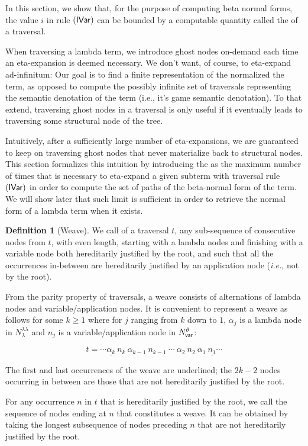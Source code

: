 \documentclass{article}
\makeatletter
\theoremstyle{definition}
\newtheorem{definition}{Definition}[section]
\newcommand\NodesVar{N_{\sf var}}%
\newcommand\NodesLmd{N_\lambda}%
\newcommand{\ghostlmd}{{\lambda\!\!\lambda}}
\newcommand{\ghostvar}{\theta}
\renewcommand\ie{{\it i.e.\@\xspace}}
\makeatother
\begin{document}
In this section, we show that, for the purpose of computing beta normal forms, the value $i$ in rule $\mathbf{({\sf IVar})}$ can be bounded by a computable quantity called the  of a traversal.

When traversing a lambda term, we introduce ghost nodes on-demand each time an eta-expansion is deemed necessary.
We don't want, of course, to eta-expand ad-infinitum: Our goal is to find a finite representation of the normalized the term, as opposed to compute the possibly infinite set of traversals representing the semantic denotation of the term (i.e., it's game semantic denotation). To that extend, traversing ghost nodes in a traversal is only useful if it eventually leads to traversing some structural node of the tree.

Intuitively, after a sufficiently large number of eta-expansions, we are guaranteed to keep on traversing ghost nodes that never materialize back to structural nodes. This section formalizes this intuition by introducing the  as the maximum number of times that is necessary to eta-expand a given subterm with traversal rule $\mathbf{({\sf IVar})}$ in order to compute the set of paths of the beta-normal form of the term. We will show later that such limit is sufficient in order to retrieve the normal form of a lambda term when it exists.

\begin{definition}[Weave]
We call  of a traversal $t$, any sub-sequence of consecutive nodes from $t$,
with even length, starting with a lambda nodes and finishing with a variable node both hereditarily justified by the root, and such that all the occurrences in-between are hereditarily justified by an application node (\ie, not by the root).

From the parity property of traversals, a weave consists of alternations of lambda nodes and variable/application nodes. It is convenient to represent a weave as follows for some $k\geq 1$ where for $j$ ranging from $k$ down to $1$, $\alpha_j$ is a lambda node in $\NodesLmd^\ghostlmd$ and $n_j$ is a variable/application node in $\NodesVar^\ghostvar$:

$$ t = \cdots \underline{\alpha_k}\ n_k\ \alpha_{k-1}\ n_{k-1}\ \cdots\ \alpha_2\ n_2\ \alpha_1\ \underline{n_1} \cdots $$

The first and last occurrences of the weave are underlined; the $2k-2$ nodes occurring in between are those that are not hereditarily justified by the root.

For any occurrence $n$ in $t$ that is hereditarily justified by the root, we call  the sequence of nodes ending at $n$ that constitutes a weave. It can be obtained by taking the longest subsequence of nodes preceding $n$ that are not hereditarily justified by the root.
\end{definition}
\end{document}
